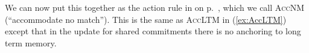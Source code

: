 \begin{ex}
\begin{subex}
\item {}
 
\end{subex} 
   
\end{ex} 
We can now put this together as the action rule in \nexteg{} on p.~\pageref{ex:AccNM},
which we call \textsc{AccNM} (``accommodate no match'').  This is the same as \textsc{AccLTM} in (\ref{ex:AccLTM}) except that
in the update for shared commitments 
there is no anchoring to long term memory.

